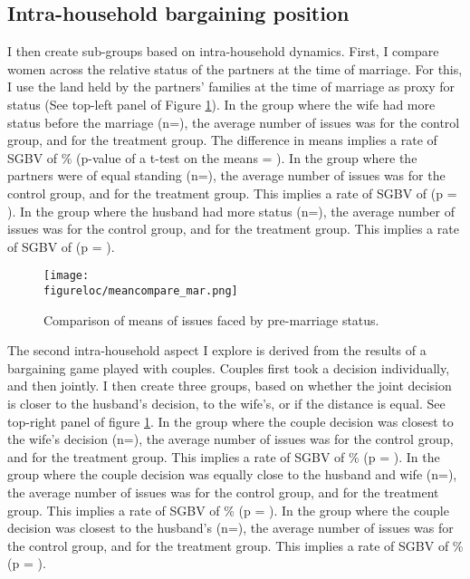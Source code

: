 \documentclass[10pt,a4paper,abstract=on]{scrartcl} %
\newcommand{\figureloc}{C:/Users/Koen/Dropbox/PhD/Papers/CongoGBV/Figures}
\begin{document}
\subsection*{Intra-household bargaining position}
I then create sub-groups based on intra-household dynamics. First, I compare women across the relative status of the partners at the time of marriage. For this, I use the land held by the partners' families at the time of marriage as proxy for status (See top-left panel of Figure \ref{fig:meancompare_mar}). In the group where the wife had more status before the marriage (n=), the average number of issues was  for the control group, and  for the treatment group. The difference in means implies a rate of SGBV of \% (p-value of a t-test on the means = ). In the group where the partners were of equal standing (n=), the average number of issues was  for the control group, and  for the treatment group. This implies a rate of SGBV of  (p = ). In the group where the husband had more status (n=), the average number of issues was  for the control group, and  for the treatment group. This implies a rate of SGBV of  (p = ).

\begin{figure}[htb]
  \texttt{[image: \\figureloc/meancompare\_mar.png]}
  \caption{Comparison of means of issues faced by pre-marriage status.}
  \label{fig:meancompare_mar}
\end{figure}

The second intra-household aspect I explore is derived from the results of a bargaining game played with couples. Couples first took a decision individually, and then jointly. I then create three groups, based on whether the joint decision is closer to the husband's decision, to the wife's, or if the distance is equal. See top-right panel of figure \ref{fig:meancompare_mar}. In the group where the couple decision was closest to the wife's decision (n=), the average number of issues was  for the control group, and  for the treatment group. This implies a rate of SGBV of \% (p = ). In the group where the couple decision was equally close to the husband and wife (n=), the average number of issues was  for the control group, and  for the treatment group. This implies a rate of SGBV of \% (p = ). In the group where the couple decision was closest to the husband's (n=), the average number of issues was  for the control group, and  for the treatment group. This implies a rate of SGBV of \% (p = ).
\end{document}
